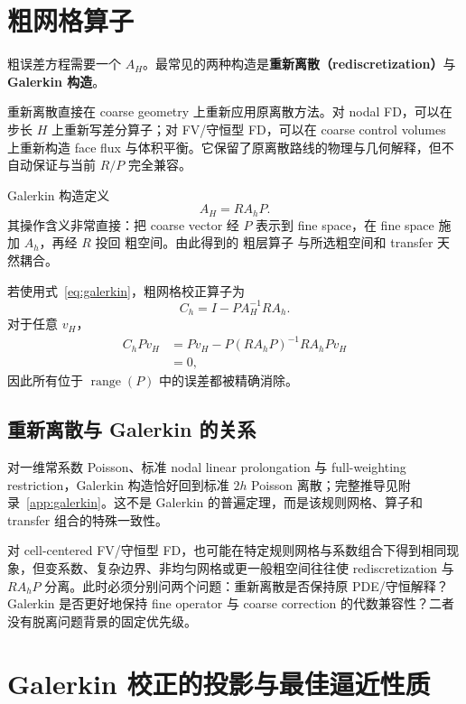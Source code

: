 \section{粗网格算子}

粗误差方程需要一个 $A_H$。最常见的两种构造是\textbf{重新离散（rediscretization）}与\textbf{Galerkin 构造}。

重新离散直接在 coarse geometry 上重新应用原离散方法。对 nodal FD，可以在步长 $H$ 上重新写差分算子；对 FV/守恒型 FD，可以在 coarse control volumes 上重新构造 face flux 与体积平衡。它保留了原离散路线的物理与几何解释，但不自动保证与当前 $R/P$ 完全兼容。

Galerkin 构造定义
\begin{equation}
\boxed{
A_H=RA_hP.
}
\label{eq:galerkin}
\end{equation}
其操作含义非常直接：把 coarse vector 经 $P$ 表示到 fine space，在 fine space 施加 $A_h$，再经 $R$ 投回 粗空间。由此得到的 粗层算子 与所选粗空间和 transfer 天然耦合。

若使用式~\eqref{eq:galerkin}，粗网格校正算子为
\begin{equation}
C_h=I-PA_H^{-1}RA_h.
\label{eq:cgc}
\end{equation}
对于任意 $v_H$，
\begin{align}
C_hPv_H
&=Pv_H-P(RA_hP)^{-1}RA_hPv_H\\
&=0,
\end{align}
因此所有位于 $\operatorname{range}(P)$ 中的误差都被精确消除。

\subsection{重新离散与 Galerkin 的关系}

对一维常系数 Poisson、标准 nodal linear prolongation 与 full-weighting restriction，Galerkin 构造恰好回到标准 $2h$ Poisson 离散；完整推导见附录~\ref{app:galerkin}。这不是 Galerkin 的普遍定理，而是该规则网格、算子和 transfer 组合的特殊一致性。

对 cell-centered FV/守恒型 FD，也可能在特定规则网格与系数组合下得到相同现象，但变系数、复杂边界、非均匀网格或更一般粗空间往往使 rediscretization 与 $RA_hP$ 分离。此时必须分别问两个问题：重新离散是否保持原 PDE/守恒解释？Galerkin 是否更好地保持 fine operator 与 coarse correction 的代数兼容性？二者没有脱离问题背景的固定优先级。

\section{Galerkin 校正的投影与最佳逼近性质}
\label{sec:twogrid-energy-projection}

